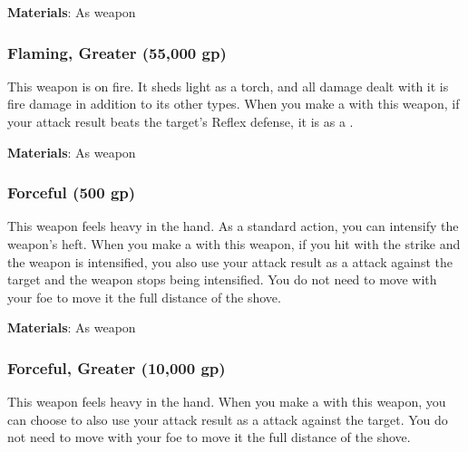 \vspace{0.25em}
\textbf{Materials}: As weapon


\lowercase{\hypertarget{item:Flaming, Greater}{}}\label{item:Flaming, Greater}
\hypertarget{item:Flaming, Greater}{\subsubsection{Flaming, Greater\hfill{} (55,000 gp)}}

This weapon is on fire.
It sheds light as a torch, and all damage dealt with it is fire damage in addition to its other types.
When you make a  with this weapon, if your attack result beats the target's Reflex defense, it is  as a .



\vspace{0.25em}
\textbf{Materials}: As weapon


\lowercase{\hypertarget{item:Forceful}{}}\label{item:Forceful}
\hypertarget{item:Forceful}{\subsubsection{Forceful\hfill{} (500 gp)}}

This weapon feels heavy in the hand.
As a standard action, you can intensify the weapon's heft.
When you make a  with this weapon, if you hit with the strike and the weapon is intensified,
you also use your attack result as a  attack against the target and the weapon stops being intensified.
You do not need to move with your foe to move it the full distance of the shove.



\vspace{0.25em}
\textbf{Materials}: As weapon


\lowercase{\hypertarget{item:Forceful, Greater}{}}\label{item:Forceful, Greater}
\hypertarget{item:Forceful, Greater}{\subsubsection{Forceful, Greater\hfill{} (10,000 gp)}}

This weapon feels heavy in the hand.
When you make a  with this weapon, you can choose to also use your attack result as a  attack against the target.
You do not need to move with your foe to move it the full distance of the shove.



